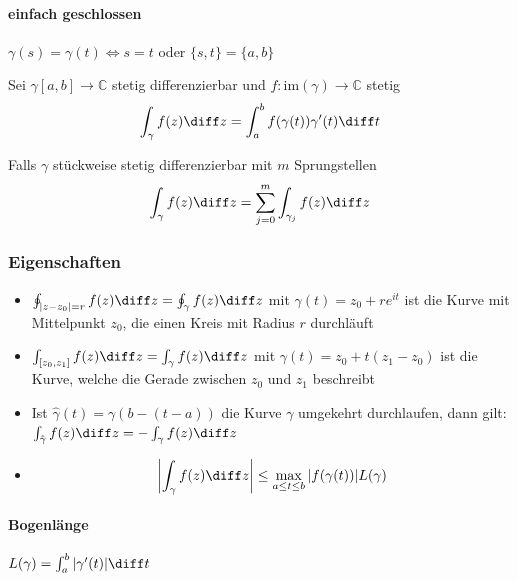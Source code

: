 \paragraph{einfach geschlossen} $\gamma(s)=\gamma(t) \Leftrightarrow s=t$ oder $\{s,t\} = \{a,b\}$
\begin{sectionbox}
    \begin{emphbox}
        Sei $\gamma [a,b] \rightarrow\mathbb C$ stetig differenzierbar und $f:\text{im}(\gamma) \rightarrow\mathbb C$ stetig
        \begin{equation*}
            \int_\gamma f(z)\diff z = \int_a^bf(\gamma(t))\gamma'(t)\diff t
        \end{equation*}

        Falls $\gamma$ stückweise stetig differenzierbar mit $m$ Sprungstellen
        \begin{equation*}
            \int_\gamma f(z)\diff z = \sum_{j=0}^{m}\int_{\gamma_j} f(z)\diff z
        \end{equation*}
    \end{emphbox}

    \subsubsection{Eigenschaften}
    \begin{itemize}
        \item $\oint_{|z-z_0|=r} f(z)\diff z=\oint_\gamma f(z)\diff z$ mit $\gamma(t) = z_0 + re^{it}$ ist die Kurve mit Mittelpunkt $z_0$, die einen Kreis mit Radius $r$ durchläuft
        \item $\int_{[z_0,z_1]}f(z)\diff z = \int_\gamma f(z)\diff z$ mit $\gamma(t) = z_0 + t(z_1-z_0)$ ist die Kurve, welche die Gerade zwischen $z_0$ und $z_1$ beschreibt
        \item Ist $\hat \gamma(t) = \gamma(b-(t-a))$ die Kurve $\gamma$ umgekehrt durchlaufen, dann gilt: $\int_{\hat \gamma}f(z)\diff z = -\int_\gamma f(z)\diff z$
        \item \begin{equation*}
                  \left|\int_\gamma f(z)\diff z\right| \le \max_{a \le t \le b}|f(\gamma(t))|L(\gamma)
              \end{equation*}
    \end{itemize}

    \paragraph{Bogenlänge} $L(\gamma) = \int_a^b |\gamma'(t)|\diff t$


\end{sectionbox}
